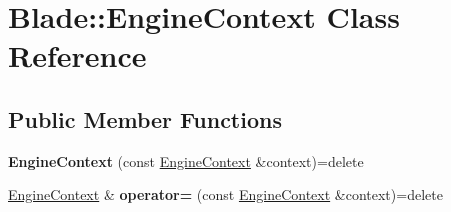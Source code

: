 \hypertarget{class_blade_1_1_engine_context}{}\section{Blade\+:\+:Engine\+Context Class Reference}
\label{class_blade_1_1_engine_context}
\subsection*{Public Member Functions}
\begin{DoxyCompactItemize}
\item 
\mbox{\label{class_blade_1_1_engine_context_a0432518913109c1063dea7a3b60b267d}} 
{\bfseries Engine\+Context} (const \hyperlink{class_blade_1_1_engine_context}{Engine\+Context} \&context)=delete
\item 
\mbox{\label{class_blade_1_1_engine_context_acd3fdd09e0fb837f5ebd78aac9360748}} 
\hyperlink{class_blade_1_1_engine_context}{Engine\+Context} \& {\bfseries operator=} (const \hyperlink{class_blade_1_1_engine_context}{Engine\+Context} \&context)=delete
\end{DoxyCompactItemize}
